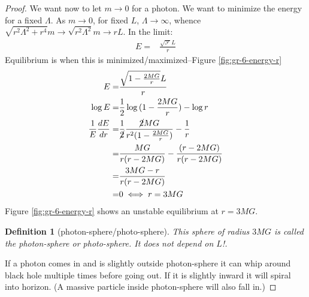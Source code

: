 \documentclass[]{article}
\newtheorem{defn}[thm]{Definition}
\begin{document}
{\begin{proof}
	We want now to let $m \rightarrow 0$ for a photon. We want to minimize the energy for a fixed $\Lambda$. As $m \rightarrow 0$, for fixed $L$, $\Lambda\rightarrow\infty$, whence $\sqrt{r^2 \Lambda^2 + r^4} m \rightarrow \sqrt{r^2 \Lambda^2 } m \rightarrow rL$. In the limit:
	\begin{align*}
		E =& \frac{\sqrt{\mathscr{F}} L }{r}
	\end{align*}
	Equilibrium is when this is minimized/maximized--Figure \ref{fig:gr-6-energy-r}
	\begin{align*}
		E 		=& \frac{\sqrt{1-\frac{2MG}{r}} L }{r}\\
		\log{E} =& \frac{1}{2} \log{(1-\frac{2MG}{r})} - \log{r}\\
		\frac{1}{E} \frac{dE}{dr} =& \frac{1}{\cancel{2}} \frac{\cancel{2}MG}{r^2 (1-\frac{2MG}{r})} - \frac{1}{r}\\
		=& \frac{MG}{r(r-2MG)} -\frac{(r-2MG)}{r(r-2MG)}\\
		=& \frac{3MG-r}{r(r-2MG)}\\
		=& 0 \iff r=3MG
	\end{align*}	
	Figure \ref{fig:gr-6-energy-r} shows an unstable equilibrium at $r=3MG$.
	
	\begin{defn}[photon-sphere/photo-sphere]
		This sphere of radius $3MG$ is called the photon-sphere or photo-sphere. It does not depend on $L$!.
	\end{defn} 

	 If a photon comes in and is slightly outside photon-sphere it can whip around black hole multiple times before going out. If it is slightly inward it will spiral into horizon. (A massive particle inside photon-sphere will also fall in.)

\end{proof}	
	
}
\end{document}
